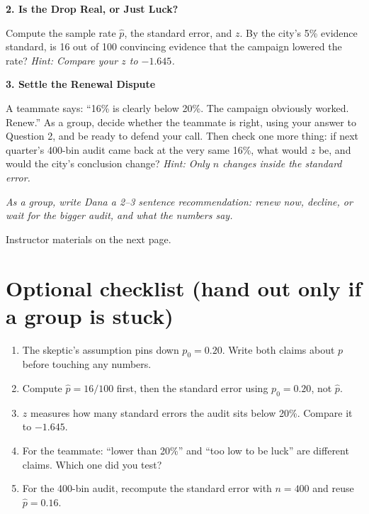 \documentclass[11pt]{article}
\newcommand{\question}[1]{\medskip\noindent\textbf{#1}\par\smallskip}
\newcommand{\hint}[1]{{\small\color{gray}\textit{Hint: #1}}\par}
\begin{document}
\question{2. Is the Drop Real, or Just Luck?}
Compute the sample rate $\hat{p}$, the standard error, and $z$. By the city's 5\% evidence standard, is 16 out of 100 convincing evidence that the campaign lowered the rate?
\hint{Compare your $z$ to $-1.645$.}

\question{3. Settle the Renewal Dispute}
A teammate says: ``16\% is clearly below 20\%. The campaign obviously worked. Renew.'' As a group, decide whether the teammate is right, using your answer to Question 2, and be ready to defend your call. Then check one more thing: if next quarter's 400-bin audit came back at the very same 16\%, what would $z$ be, and would the city's conclusion change?
\hint{Only $n$ changes inside the standard error.}

\medskip
\noindent\textit{As a group, write Dana a 2--3 sentence recommendation: renew now, decline, or wait for the bigger audit, and what the numbers say.}

\vfill
\begin{center}\small\color{gray}Instructor materials on the next page.\end{center}

\newpage

\section*{Optional checklist (hand out only if a group is stuck)}
\begin{enumerate}[leftmargin=*, itemsep=3pt]
\item The skeptic's assumption pins down $p_0 = 0.20$. Write both claims about $p$ before touching any numbers.
\item Compute $\hat{p} = 16/100$ first, then the standard error using $p_0 = 0.20$, not $\hat{p}$.
\item $z$ measures how many standard errors the audit sits below 20\%. Compare it to $-1.645$.
\item For the teammate: ``lower than 20\%'' and ``too low to be luck'' are different claims. Which one did you test?
\item For the 400-bin audit, recompute the standard error with $n = 400$ and reuse $\hat{p} = 0.16$.
\end{enumerate}
\end{document}
